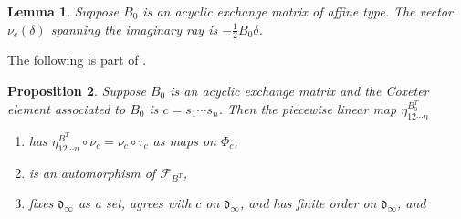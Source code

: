 \documentclass{amsart}
\newtheorem{proposition}{Proposition}[section]
\newtheorem{lemma}[proposition]{Lemma}
\theoremstyle{definition}
\theoremstyle{remark}
\numberwithin{equation}{section}
\newcommand{\set}[1]{{\lbrace #1 \rbrace}}
\newcommand{\br}[1]{{\langle #1 \rangle}}
\newcommand{\F}{{\mathcal F}}
\newcommand{\0}{{\mathbf{0}}}
\newcommand{\g}{\mathbf{g}}
\renewcommand{\d}{{\mathfrak d}}
\newcommand{\fin}{\mathrm{fin}}
\newcommand{\RSChar}{\Phi}
\newcommand{\RS}{\RSChar}
\newcommand{\RSfin}{\RS_\fin}
\newcommand{\AP}[1]{\RS_{#1}}
\begin{document}
\begin{lemma}\label{nu delta}  
Suppose $B_0$ is an acyclic exchange matrix of affine type.
The vector~$\nu_c(\delta)$ spanning the imaginary ray is $-\frac12B_0\delta$.
\end{lemma}

The following  is part of \cite[Proposition~7.31]{affscat}.

\begin{proposition}\label{eta nice} 
Suppose $B_0$ is an acyclic exchange matrix and the Coxeter element associated to $B_0$ is $c=s_1\cdots s_n$.
Then the piecewise linear map $\eta^{B_0^T}_{12\cdots n}$
\begin{enumerate}[\quad\bf1.]
\item \label{nu tau}   
has $\eta^{B^T}_{12\cdots n}\circ\nu_c=\nu_c\circ\tau_c$ as maps on $\AP{c}$, 
\item\label{eta aut mut}
is an automorphism of $\F_{B^T}$,
\item\label{eta is c}
fixes $\d_\infty$ as a set, agrees with $c$ on $\d_\infty$, and has finite order on $\d_\infty$, and
\end{enumerate}
\end{proposition}
\end{document}
